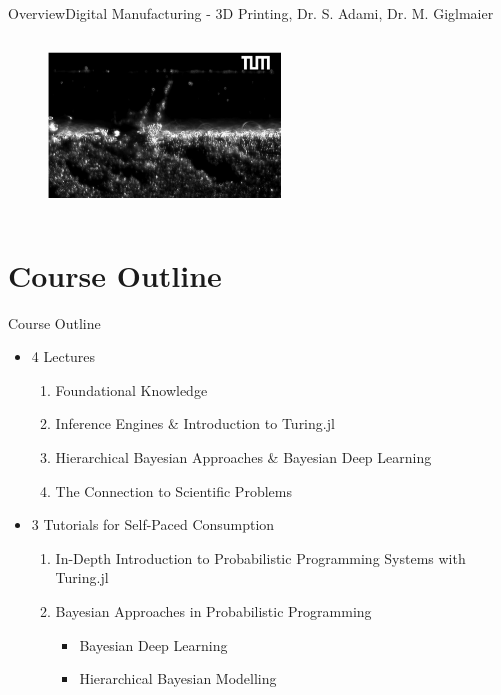 \documentclass[AERbeamer%
              ,optEnglish%
              ,optBiber%
              ,optBibstyleAlphabetic%
              ,optBeamerClassicFormat%
              ]{AERlatex}%
\begin{document}
\begin{frame}[c]{Overview}{Digital Manufacturing - 3D Printing, Dr. S. Adami, Dr. M. Giglmaier}
\begin{columns}[T]
\begin{column}{0.48\textwidth}
\begin{itemize}
            \end{itemize}
            \begin{figure}
                \centering
                \includegraphics[width=0.55\textwidth]{3DPrinting2.png}
            \end{figure}
        \end{column}
    \end{columns}
\end{frame}



\section{Course Outline}

\begin{frame}[c]{Course Outline}
    \centering
    \begin{itemize}
        \item 4 Lectures
        \begin{enumerate}
            \item Foundational Knowledge
            \item Inference Engines \& Introduction to Turing.jl
            \item Hierarchical Bayesian Approaches \& Bayesian Deep Learning
            \item The Connection to Scientific Problems
        \end{enumerate}
        \item 3 Tutorials for Self-Paced Consumption
        \begin{enumerate}
            \item In-Depth Introduction to Probabilistic Programming Systems with Turing.jl
            \item Bayesian Approaches in Probabilistic Programming
            \begin{itemize}
                \item Bayesian Deep Learning
                \item Hierarchical Bayesian Modelling
            \end{itemize}
        \end{enumerate}
    \end{itemize}
\end{frame}
\end{document}
